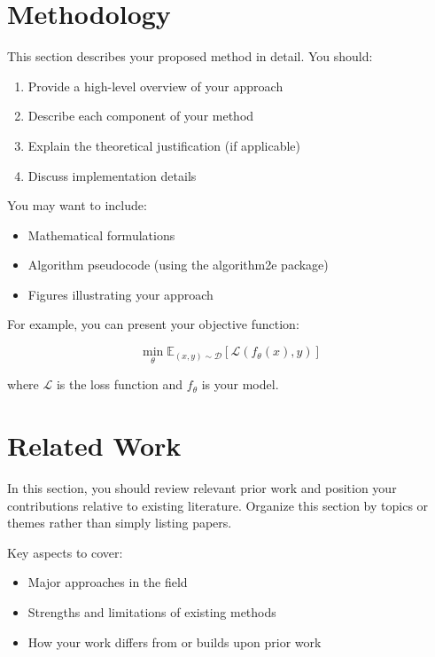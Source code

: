 \documentclass[10pt, a4paper, logo]{googledeepmind}
\begin{document}
\section{Methodology}
\label{sec:methodology}

This section describes your proposed method in detail. You should:

\begin{enumerate}
    \item Provide a high-level overview of your approach
    \item Describe each component of your method
    \item Explain the theoretical justification (if applicable)
    \item Discuss implementation details
\end{enumerate}

You may want to include:
\begin{itemize}
    \item Mathematical formulations
    \item Algorithm pseudocode (using the algorithm2e package)
    \item Figures illustrating your approach
\end{itemize}

For example, you can present your objective function:

\begin{equation}
\label{eq:objective}
\min_{\theta} \mathbb{E}_{(x,y) \sim \mathcal{D}} \left[ \mathcal{L}(f_\theta(x), y) \right]
\end{equation}

where $\mathcal{L}$ is the loss function and $f_\theta$ is your model.

\section{Related Work}
\label{sec:related_work}

In this section, you should review relevant prior work and position your contributions relative to existing literature. Organize this section by topics or themes rather than simply listing papers.

Key aspects to cover:
\begin{itemize}
    \item Major approaches in the field
    \item Strengths and limitations of existing methods
    \item How your work differs from or builds upon prior work
\end{itemize}
\end{document}
